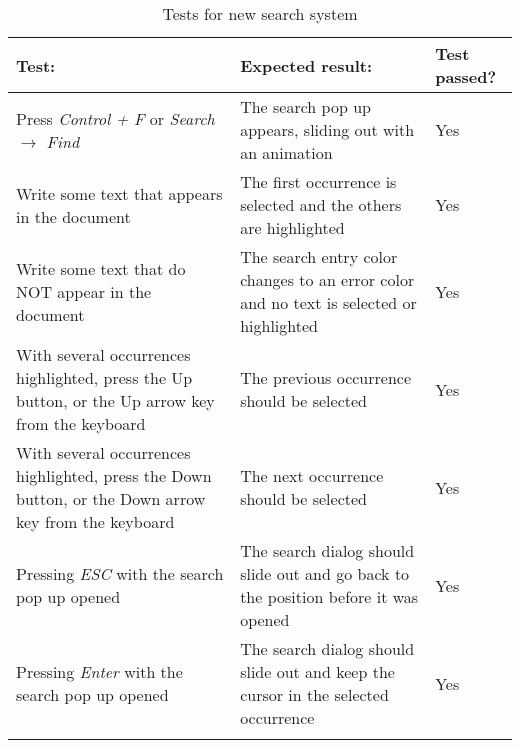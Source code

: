 \begin{table}[H]
  \begin{center}
    \begin{tabularx}{\textwidth}{|X|X|l|}
      \firsthline
      \textbf{Test:} & \textbf{Expected result:} & \textbf{Test passed?} \\
      \hline
      Press \emph{Control + F} or \emph{Search $\to$ Find} & The search pop up appears, sliding out with an animation & Yes \\
      \hline
      Write some text that appears in the document & The first occurrence is selected and the others are highlighted & Yes \\
      \hline
      Write some text that do NOT appear in the document & The search entry color changes to an error color and no text is selected or highlighted & Yes \\
      \hline
      With several occurrences highlighted, press the Up button, or the Up arrow key from the keyboard & The previous occurrence should be selected & Yes \\
      \hline
      With several occurrences highlighted, press the Down button, or the Down arrow key from the keyboard & The next occurrence should be selected & Yes \\
      \hline
      Pressing \emph{ESC} with the search pop up opened & The search dialog should slide out and go back to the position before it was opened & Yes \\
      \hline
      Pressing \emph{Enter} with the search pop up opened & The search dialog should slide out and keep the cursor in the selected occurrence & Yes \\
      \lasthline
    \end{tabularx}
    \caption{Tests for new search system}
  \end{center}
\end{table}
